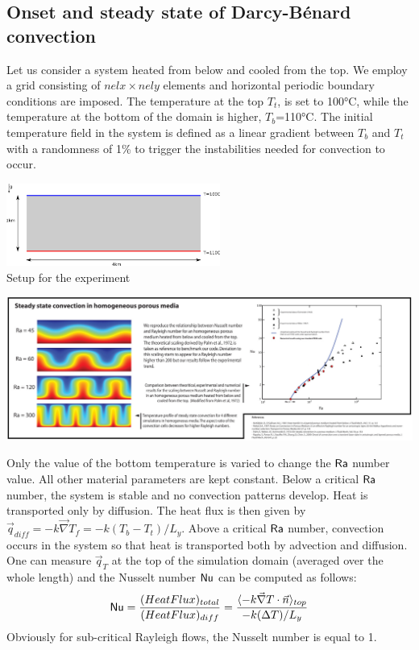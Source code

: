 \subsection*{Onset and steady state of Darcy-B\'enard convection}

Let us consider a system heated from below and cooled from the top. We employ a 
grid consisting of $nelx\times nely$ elements and horizontal periodic boundary conditions are imposed. 
The temperature at the top $T_t$, is set to 100\si{\celsius}, while the temperature at the 
bottom of the domain is higher, $T_b$=110\si{\celsius}. The initial temperature field in the system is defined 
as a linear gradient between $T_b$ and $T_t$ with a randomness of 1\% to trigger the 
instabilities needed for convection to occur. 

\begin{center}
\includegraphics[width=7cm]{python_codes/fieldstone_107/images/drawing}\\
{\captionfont Setup for the experiment}
\end{center}

\begin{center}
\includegraphics[width=14cm]{python_codes/fieldstone_107/images/souche_conv}
\end{center}

Only the value of the bottom temperature is varied to change the ${\mathsf{Ra}}$ number value. 
All other material parameters are kept constant.
Below a critical ${\mathsf{Ra}}$ number, the system is stable and no convection patterns develop. Heat 
is transported only by diffusion.
The heat flux is then given by $\vec{q}_{diff}=-k \vec{\nabla} T_f=-k (T_b-T_t)/L_y$.
Above a critical ${\mathsf{Ra}}$ number, convection occurs in the system so that heat is transported 
both by advection and diffusion. 
One can measure $\vec{q}_T$ at the top of the simulation domain (averaged over the whole length) and 
the Nusselt number ${\mathsf{Nu}}$ can be computed as follows:
\[
{\mathsf{Nu}}=\frac{(Heat Flux)_{total}}{(Heat Flux)_{diff}} 
= \frac{\langle - k \vec{\nabla}T \cdot \vec{n}\rangle_{top}}{ -k (\Delta T)/L_y}
\]
Obviously for sub-critical Rayleigh flows, the Nusselt number is equal to 1. 

